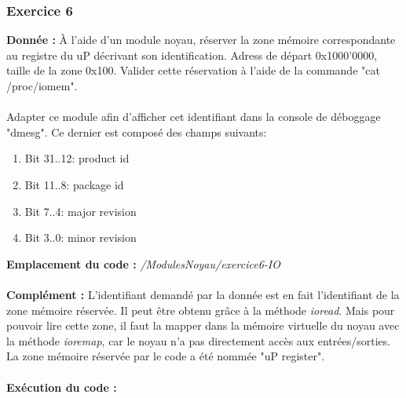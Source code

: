 \subsubsection{Exercice 6}
\textbf{Donnée : }À l'aide d'un module noyau, réserver la zone mémoire correspondante au registre du uP décrivant son identification. Adress de départ 0x1000'0000, taille de la zone 0x100. Valider cette réservation à l'aide de la commande "cat /proc/iomem".\\
\\
Adapter ce module afin d'afficher cet identifiant dans la console de déboggage "dmesg". Ce dernier est composé des champs suivants:
\begin{enumerate}
	\item Bit 31..12: product id
	\item Bit 11..8: package id
	\item Bit 7..4: major revision
	\item Bit 3..0: minor revision\\
\end{enumerate}
\textbf{Emplacement du code : } \textit{/ModulesNoyau/exercice6-IO}\\\\
\textbf{Complément : }L'identifiant demandé par la donnée est en fait l'identifiant de la zone mémoire réservée. Il peut être obtenu grâce à la méthode \textit{ioread}. Mais pour pouvoir lire cette zone, il faut la mapper dans la mémoire virtuelle du noyau avec la méthode \textit{ioremap}, car le noyau n'a pas directement accès aux entrées/sorties.\\
La zone mémoire réservée par le code a été nommée "uP register".\\\\
\textbf{Exécution du code : }
